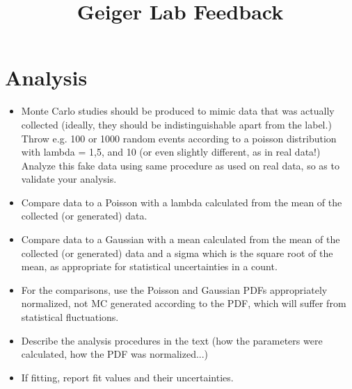 \documentclass[12pt]{article}
\begin{document}


\title{Geiger Lab Feedback}

\maketitle



\section{Analysis}
\begin{itemize}
\item Monte Carlo studies should be produced to mimic data that was actually collected (ideally, they should be indistinguishable apart from the label.)  Throw e.g. 100 or 1000 random events according to a poisson distribution with lambda = 1,5, and 10 (or even slightly different, as in real data!)  Analyze this fake data using same procedure as used on real data, so as to validate your analysis.

\item Compare data to a Poisson with a lambda calculated from the mean of the collected (or generated) data.  

\item Compare data to a Gaussian with a mean calculated from the mean of the collected (or generated) data and a sigma which is the square root of the mean, as appropriate for statistical uncertainties in a count.

\item For the comparisons, use the Poisson and Gaussian PDFs appropriately normalized, not MC generated according to the PDF, which will suffer from statistical fluctuations.

\item Describe the analysis procedures in the text (how the parameters were calculated, how the PDF was normalized...)

\item If fitting, report fit values and their uncertainties.
\end{itemize}
\end{document}

